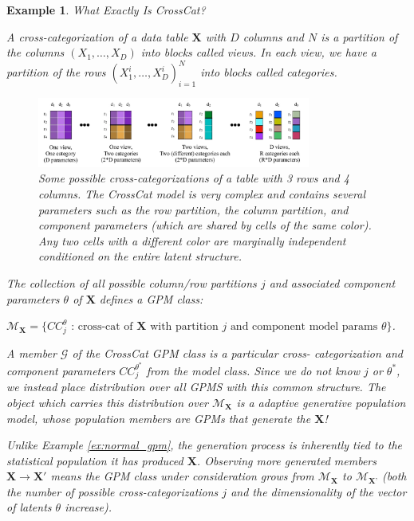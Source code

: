 \documentclass[10pt,letterpaper]{article}
\newtheorem{example}{Example}[section]
\newcommand{\set}[1]{\{#1\}}
\begin{document}
\begin{example} \label{ex:crosscat} What Exactly Is CrossCat?

A cross-categorization of a data table $\mathbf{X}$ with $D$ columns and $N$ is
a partition of the columns $(X_1,\dots,X_D)$ into blocks called \textit{views}.
In each view, we have a partition of the rows $(X_1^{i},\dots,X_D^{i})_{i=1}^N$
into blocks called \textit{categories}.

\begin{figure}[ht]
    \centering
\includegraphics[width=0.8\textwidth]{cc.jpeg}
\caption{Some possible cross-categorizations of a table with 3 rows and 4
columns. The CrossCat model is very complex and contains several parameters such
as the row partition, the column partition, and component parameters (which are
shared by cells of the same color). Any two cells with a different color are
marginally independent conditioned on the entire latent structure.}
\label{fig:cc}
\end{figure}
The collection of all possible column/row partitions $j$ and associated
component parameters $\theta$ of $\mathbf{X}$ defines a GPM class:

$\mathcal{M}_\textbf{X} = \set{CC_j^{\theta} \text{ : cross-cat of } \mathbf{X}
\text{ with partition } j \text{ and component model params } \theta}$.

A member $\mathcal{G}$ of the CrossCat GPM class is a particular cross-
categorization and component parameters $CC_j^{\theta^*}$ from the model class.
Since we do not know $j$ or $\theta^*$, we instead place distribution over all
GPMS with this common structure. The object which carries this distribution over
$\mathcal{M}_\textbf{X}$ is a adaptive generative population model, whose
population members are GPMs that generate the $\mathbf{X}$!

Unlike Example \ref{ex:normal_gpm}, the generation process is inherently tied to
the statistical population it has produced $\mathbf{X}$. Observing more
generated members $\mathbf{X} \to
\mathbf{X}'$ means the GPM class under consideration grows from
$\mathcal{M}_\textbf{X}$ to $\mathcal{M}_\textbf{X'}$ (both the number of
possible cross-categorizations $j$ and the dimensionality of the vector of
latents $\theta$ increase).

\end{example}
\end{document}
